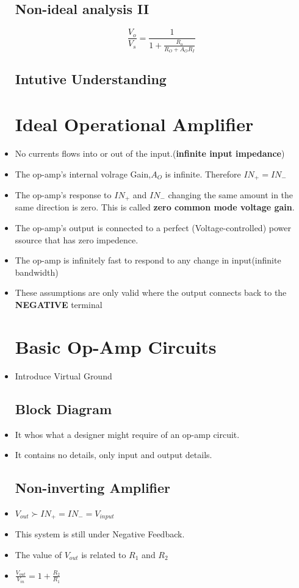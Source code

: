 \documentclass[12pt]{article}
\begin{document}
\begin{itemize}
\subsection{Non-ideal analysis II}
\begin{displaymath}
\frac{V_o}{V_s}=\frac{1}{1+\frac{R_o}{R_O+A_OR_I}}
\end{displaymath}
\subsection{Intutive Understanding}

\pagebreak
\section{Ideal Operational Amplifier}
\item No currents flows into or out of the input.(\textbf{infinite input impedance})
\item The op-amp's internal volrage Gain,$A_O$ is infinite. Therefore $IN_+=IN_-$
\item The op-amp's response to $IN_+$ and $IN_-$ changing the same amount in the same direction is zero. This is called \textbf{zero common mode voltage gain}.
\item The op-amp's output is connected to a perfect (Voltage-controlled) power ssource that has zero impedence.
\item The op-amp is infinitely fast to respond to any change in input(infinite bandwidth)
\item These assumptions are only valid where the output connects back to the \textbf{NEGATIVE} terminal
\pagebreak
\section{Basic Op-Amp Circuits}
\item Introduce Virtual Ground
\subsection{Block Diagram}
\item It whos what a designer might require of an op-amp circuit. 
\item It contains no details, only input and output details.
\subsection{Non-inverting Amplifier}
\item $V_{out} \succ IN_+=IN_-=V_{input}$ 
\item This system is still under Negative Feedback.
\item The value of $V_{out}$ is related to $R_1$ and $R_2$
\item $\frac{V_{out}}{V_{in}}=1+\frac{R_2}{R_1}$
\pagebreak


\end{itemize}
\end{document}
